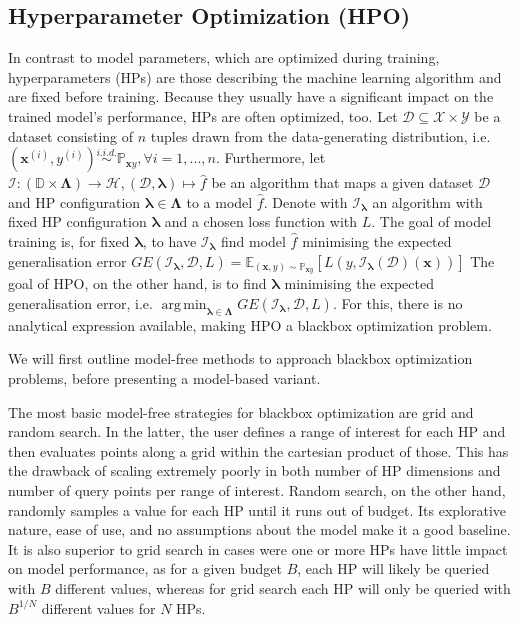 \documentclass[twoside,11pt]{article}
\DeclareMathOperator*{\argmin}{arg\,min}
\begin{document}
\subsection{Hyperparameter Optimization (HPO)}
In contrast to model parameters, which are optimized during training, hyperparameters (HPs) are those describing the machine learning algorithm and are
fixed before training. Because they usually have a significant impact on the trained model's performance, HPs are often optimized, too.
Let $\mathcal{D}\subseteq\mathcal{X}\times\mathcal{Y}$ be a dataset consisting of $n$
tuples drawn from the data-generating distribution, i.e. $(\boldsymbol{x}^{(i)}, y^{(i)})\stackrel{i.i.d.}{\sim}\mathbb{P}_{\boldsymbol{x}y},\forall i=1,...,n$.
Furthermore, let $\mathcal{I}:(\mathbb{D}\times\boldsymbol\Lambda)\rightarrow\mathcal{H}, (\mathcal{D},\boldsymbol\lambda)\mapsto\hat{f}$
be an algorithm that maps a given dataset $\mathcal{D}$ and HP configuration $\boldsymbol\lambda\in\boldsymbol\Lambda$ to a model $\hat{f}$.
Denote with $\mathcal{I}_{\boldsymbol\lambda}$ an algorithm with fixed HP configuration $\boldsymbol\lambda$ and a chosen loss function with $L$.
The goal of model training is, for fixed $\boldsymbol\lambda$, to have $\mathcal{I}_{\boldsymbol\lambda}$ find model $\hat{f}$ minimising the expected generalisation error
$GE(\mathcal{I}_{\boldsymbol\lambda},\mathcal{D},L)=\mathbb{E}_{(\boldsymbol{x},y)\sim\mathbb{P}_{\boldsymbol{x}y}}[L(y,\mathcal{I}_{\boldsymbol\lambda}(\mathcal{D})(\boldsymbol{x}))]$
The goal of HPO, on the other hand, is to find $\boldsymbol\lambda$ minimising the expected generalisation error,
i.e. $\argmin_{\boldsymbol\lambda\in\boldsymbol\Lambda} GE(\mathcal{I}_{\boldsymbol\lambda},\mathcal{D},L)$.
For this, there is no analytical expression available, making HPO a blackbox optimization problem. \citep[pp. 2f]{10.1145/3610536}

We will first outline model-free methods to approach blackbox optimization problems, before presenting a model-based variant.

The most basic model-free strategies for blackbox optimization are grid and random search.
In the latter, the user defines a range of interest for each HP and then evaluates points along a grid within the cartesian product of those.
This has the drawback of scaling extremely poorly in both number of HP dimensions and number of query points per range of interest.
Random search, on the other hand, randomly samples a value for each HP until it runs out of budget. Its explorative nature, ease of use, and no assumptions
about the model make it a good baseline. It is also superior to grid search in cases were one or more HPs have little impact on model performance,
as for a given budget $B$, each HP will likely be queried with $B$ different values, whereas for grid search each HP will only be queried with $B^{1/N}$
different values for $N$ HPs. \citep[pp. 7f]{feurer_hyperparameter_2019}
\end{document}
